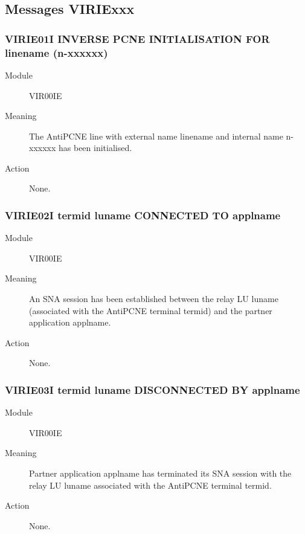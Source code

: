 \documentclass[letterpaper,10pt,english]{sphinxmanual}
\begin{document}
\subsection{Messages VIRIExxx}
\label{\detokenize{messages:messages-viriexxx}}

\subsubsection{VIRIE01I INVERSE PCNE INITIALISATION FOR linename (n-xxxxxx)}
\label{\detokenize{messages:virie01i-inverse-pcne-initialisation-for-linename-n-xxxxxx}}\begin{description}
\item[{Module}] \leavevmode
VIR00IE

\item[{Meaning}] \leavevmode
The AntiPCNE line with external name linename and internal name n-xxxxxx has been initialised.

\item[{Action}] \leavevmode
None.

\end{description}


\subsubsection{VIRIE02I termid luname CONNECTED TO applname}
\label{\detokenize{messages:virie02i-termid-luname-connected-to-applname}}\begin{description}
\item[{Module}] \leavevmode
VIR00IE

\item[{Meaning}] \leavevmode
An SNA session has been established between the relay LU luname (associated with the AntiPCNE terminal termid) and the partner application applname.

\item[{Action}] \leavevmode
None.

\end{description}


\subsubsection{VIRIE03I termid luname DISCONNECTED BY applname}
\label{\detokenize{messages:virie03i-termid-luname-disconnected-by-applname}}\begin{description}
\item[{Module}] \leavevmode
VIR00IE

\item[{Meaning}] \leavevmode
Partner application applname has terminated its SNA session with the relay LU luname associated with the AntiPCNE terminal termid.

\item[{Action}] \leavevmode
None.

\end{description}
\end{document}
